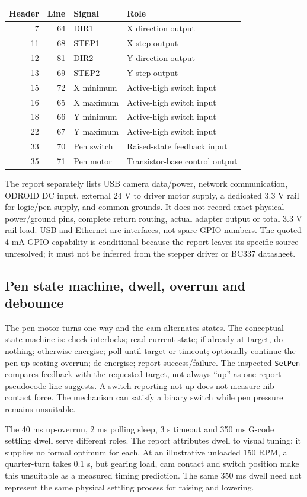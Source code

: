 \begin{center}\small
\begin{tabular}{rrll}
\toprule Header & Line & Signal & Role \\\midrule
7&64& DIR1 & X direction output\\
11&68& STEP1 & X step output\\
12&81& DIR2 & Y direction output\\
13&69& STEP2 & Y step output\\
15&72& X minimum & Active-high switch input\\
16&65& X maximum & Active-high switch input\\
18&66& Y minimum & Active-high switch input\\
22&67& Y maximum & Active-high switch input\\
33&70& Pen switch & Raised-state feedback input\\
35&71& Pen motor & Transistor-base control output\\
\bottomrule
\end{tabular}
\end{center}
The report separately lists USB camera data/power, network communication,
ODROID DC input, external 24 V to driver motor supply, a dedicated 3.3 V
rail for logic/pen supply, and common grounds. It does not record exact
physical power/ground pins, complete return routing, actual adapter output
or total 3.3 V rail load. USB and Ethernet are interfaces, not spare GPIO
numbers. The quoted 4 mA GPIO capability is conditional because the report
leaves its specific source unresolved; it must not be inferred from the
stepper driver or BC337 datasheet.

\subsection{Pen state machine, dwell, overrun and debounce}
The pen motor turns one way and the cam alternates states. The conceptual
state machine is: check interlocks; read current state; if already at target,
do nothing; otherwise energise; poll until target or timeout; optionally
continue the pen-up seating overrun; de-energise; report success/failure.
The inspected \texttt{SetPen} compares feedback with the requested target,
not always ``up'' as one report pseudocode line suggests. A switch reporting
not-up does not measure nib contact force. The mechanism can satisfy a
binary switch while pen pressure remains unsuitable.

The 40 ms up-overrun, 2 ms polling sleep, 3 s timeout and 350 ms G-code
settling dwell serve different roles. The report attributes dwell to visual
tuning; it supplies no formal optimum for each. At an illustrative unloaded
150 RPM, a quarter-turn takes 0.1 s, but gearing load, cam contact and
switch position make this unsuitable as a measured timing prediction.
The same 350 ms dwell need not represent the same physical settling process
for raising and lowering.

